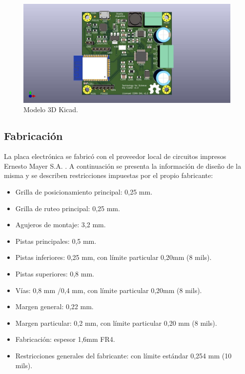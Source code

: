 \begin{figure}[h!]
	\centering
	\includegraphics[width=1\textwidth]{./Figures/tecsci_dip.jpg}
	\caption{Modelo 3D Kicad.}
	\label{fig:dip_3d_model}
\end{figure}
         



  
\subsection{Fabricación}
La placa electrónica se fabricó con el proveedor local de circuitos impresos Ernesto Mayer S.A. \citep{web_mayer}. A continuación se presenta la información de diseño de la misma y se describen  restricciones impuestas por el propio fabricante:

\begin{itemize}

\item Grilla de posicionamiento principal: 0,25 mm.
\item Grilla de ruteo principal: 0,25 mm.
\item Agujeros de montaje: 3,2 mm.
\item Pistas principales: 0,5 mm.
\item Pistas inferiores: 0,25 mm, con límite particular 0,20mm (8 mils).
\item Pistas superiores: 0,8 mm.
\item Vías: 0,8 mm /0,4 mm, con límite particular 0,20mm (8 mils).
\item Margen general: 0,22 mm.
\item Margen particular: 0,2 mm, con límite particular 0,20 mm (8 mils).
\item Fabricación: espesor 1,6mm FR4.  
\item Restricciones generales del fabricante: con límite estándar 0,254 mm (10 mils).

\end{itemize}

